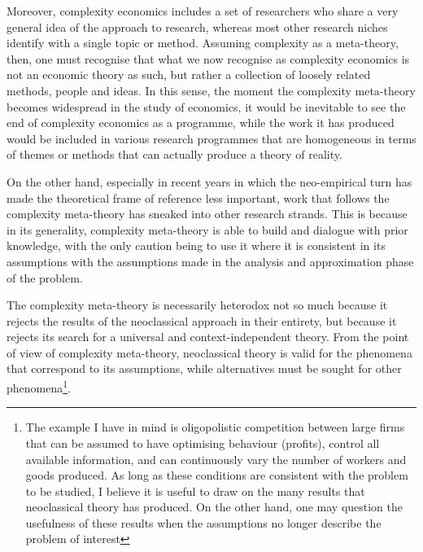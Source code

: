 Moreover, complexity economics includes a set of researchers who share a very general idea of the approach to research, whereas most other research niches identify with a single topic or method.
Assuming complexity as a meta-theory, then, one must recognise that what we now recognise as complexity economics is not an economic theory as such, but rather a collection of loosely related methods, people and ideas.
In this sense, the moment the complexity meta-theory becomes widespread in the study of economics, it would be inevitable to see the end of complexity economics as a programme, while the work it has produced would be included in various research programmes that are homogeneous in terms of themes or methods that can actually produce a theory of reality.

On the other hand, especially in recent years in which the neo-empirical turn has made the theoretical frame of reference less important, work that follows the complexity meta-theory has sneaked into other research strands.
This is because in its generality, complexity meta-theory is able to build and dialogue with prior knowledge, with the only caution being to use it where it is consistent in its assumptions with the assumptions made in the analysis and approximation phase of the problem.

The complexity meta-theory is necessarily heterodox not so much because it rejects the results of the neoclassical approach in their entirety, but because it rejects its search for a universal and context-independent theory.
From the point of view of complexity meta-theory, neoclassical theory is valid for the phenomena that correspond to its assumptions, while alternatives must be sought for other phenomena\footnote{The example I have in mind is oligopolistic competition between large firms that can be assumed to have optimising behaviour (profits), control all available information, and can continuously vary the number of workers and goods produced. As long as these conditions are consistent with the problem to be studied, I believe it is useful to draw on the many results that neoclassical theory has produced. On the other hand, one may question the usefulness of these results when the assumptions no longer describe the problem of interest}.

